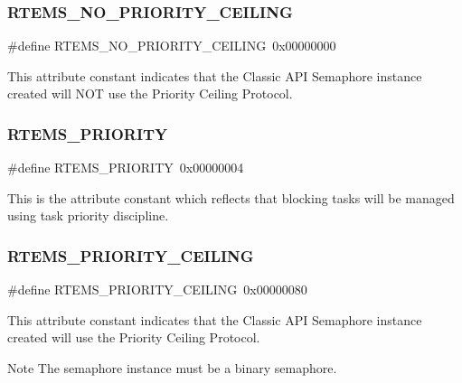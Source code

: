 \subsubsection{\texorpdfstring{RTEMS\_NO\_PRIORITY\_CEILING}{RTEMS\_NO\_PRIORITY\_CEILING}}
{\footnotesize\ttfamily \#define R\+T\+E\+M\+S\+\_\+\+N\+O\+\_\+\+P\+R\+I\+O\+R\+I\+T\+Y\+\_\+\+C\+E\+I\+L\+I\+NG~0x00000000}

This attribute constant indicates that the Classic A\+PI Semaphore instance created will N\+OT use the Priority Ceiling Protocol. \mbox{\label{group__ClassicAttributes_ga8e38aee651d2ccf2d44b70eb9b570e52}} 
\subsubsection{\texorpdfstring{RTEMS\_PRIORITY}{RTEMS\_PRIORITY}}
{\footnotesize\ttfamily \#define R\+T\+E\+M\+S\+\_\+\+P\+R\+I\+O\+R\+I\+TY~0x00000004}

This is the attribute constant which reflects that blocking tasks will be managed using task priority discipline. \mbox{\label{group__ClassicAttributes_ga91be26357eaf5275533aef61c9ac199e}} 
\subsubsection{\texorpdfstring{RTEMS\_PRIORITY\_CEILING}{RTEMS\_PRIORITY\_CEILING}}
{\footnotesize\ttfamily \#define R\+T\+E\+M\+S\+\_\+\+P\+R\+I\+O\+R\+I\+T\+Y\+\_\+\+C\+E\+I\+L\+I\+NG~0x00000080}

This attribute constant indicates that the Classic A\+PI Semaphore instance created will use the Priority Ceiling Protocol.

\begin{DoxyNote}{Note}
The semaphore instance must be a binary semaphore. 
\end{DoxyNote}
\mbox{\label{group__ClassicAttributes_ga32cf23b1d18f4f599e9211aff2a09c45}} 
